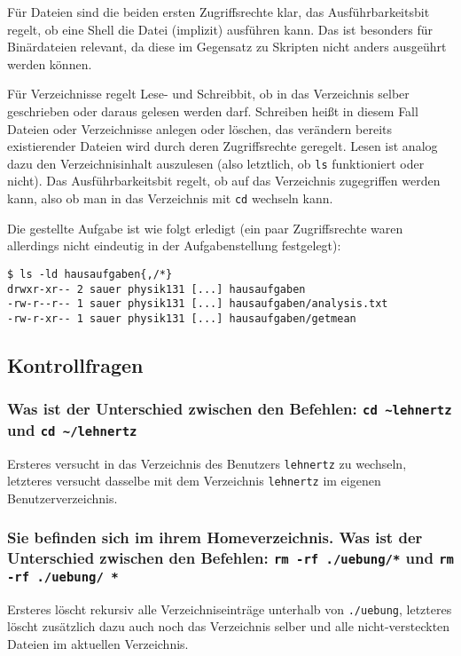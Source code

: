 F\"ur Dateien sind die beiden ersten Zugriffsrechte klar, das
Ausf\"uhrbarkeitsbit regelt, ob eine Shell die Datei (implizit) ausf\"uhren
kann. Das ist besonders f\"ur Bin\"ardateien relevant, da diese im Gegensatz zu
Skripten nicht anders ausge\"uhrt werden k\"onnen.

F\"ur Verzeichnisse regelt Lese- und Schreibbit, ob in das Verzeichnis selber
geschrieben oder daraus gelesen werden darf. Schreiben hei\ss{}t in diesem Fall
Dateien oder Verzeichnisse anlegen oder l\"oschen, das ver\"andern bereits
existierender Dateien wird durch deren Zugriffsrechte geregelt. Lesen ist analog
dazu den Verzeichnisinhalt auszulesen (also letztlich, ob \lstinline'ls'
funktioniert oder nicht). Das Ausf\"uhrbarkeitsbit regelt, ob auf das
Verzeichnis zugegriffen werden kann, also ob man in das Verzeichnis mit
\lstinline'cd' wechseln kann.

Die gestellte Aufgabe ist wie folgt erledigt (ein paar Zugriffsrechte waren
allerdings nicht eindeutig in der Aufgabenstellung festgelegt):
\begin{lstlisting}
$ ls -ld hausaufgaben{,/*}
drwxr-xr-- 2 sauer physik131 [...] hausaufgaben
-rw-r--r-- 1 sauer physik131 [...] hausaufgaben/analysis.txt
-rw-r-xr-- 1 sauer physik131 [...] hausaufgaben/getmean
\end{lstlisting}

\subsection{Kontrollfragen}

\subsubsection*{Was ist der Unterschied zwischen den Befehlen: \lstinline'cd
~lehnertz' und \lstinline'cd ~/lehnertz'}
Ersteres versucht in das Verzeichnis des Benutzers \verb'lehnertz' zu wechseln,
letzteres versucht dasselbe mit dem Verzeichnis \verb'lehnertz' im eigenen
Benutzerverzeichnis.

\subsubsection*{Sie befinden sich im ihrem Homeverzeichnis. Was ist der
Unterschied zwischen den Befehlen: \lstinline'rm -rf ./uebung/*' und
\lstinline'rm -rf ./uebung/ *'}
Ersteres l\"oscht rekursiv alle Verzeichniseintr\"age unterhalb von
\verb'./uebung', letzteres l\"oscht zus\"atzlich dazu auch noch das Verzeichnis
selber und alle nicht-versteckten Dateien im aktuellen Verzeichnis.

